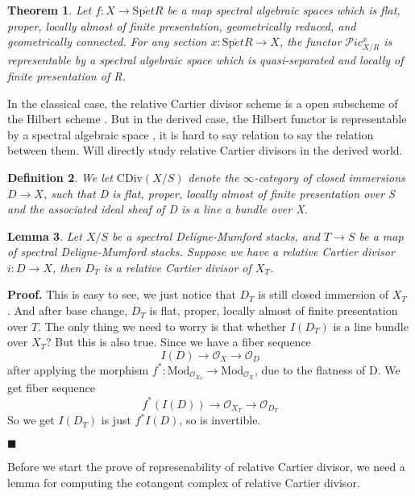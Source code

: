 \documentclass[12pt]{article}
\newtheorem{theorem}{Theorem}[section] %
\newtheorem{lemma}[theorem]{Lemma}
\theoremstyle{thry}
\newtheorem{definition}[theorem]{Definition}
\renewenvironment{proof}
{\par \noindent \textbf{Proof.}}
{ \par \hfill $\blacksquare$ \quad \par }
\def  \CDiv     {\mathrm{CDiv}}
\def  \Mod      {\mathrm{Mod}}
\def  \Spet     {\mathrm{Sp}\acute{e}t}
\def  \co       {\mathcal{O}}
\def  \sp       {\mathscr{P}}
\begin{document}
\begin{theorem}\cite[Theorem 19.2.0.5]{lu-SAG}
	Let $f: X \to \Spet R$ be a map spectral algebraic spaces which is flat, proper, locally almost of finite presentation, geometrically reduced, and geometrically connected. For any section $x: \Spet R \to X$, the functor $\sp ic^x_{X/R}$ is representable by a spectral algebraic space which is quasi-separated and locally of finite presentation of R.
\end{theorem}

 In the classical case, the relative Cartier divisor scheme is a open subscheme of the Hilbert scheme \cite{kollar2013rational}. But in the derived case, the Hilbert functor is representable by a spectral algebraic space \cite[Theorem 8.3.3]{lurie2004derived}, it is hard to say relation to say the relation between them. Will directly study  relative Cartier divisors in the derived world.







\begin{definition}
	We let $\CDiv(X/S)$ denote the $\infty$-category of closed immersions $D \to X$, such that D is flat, proper, locally almost of finite presentation over S and  the associated ideal sheaf of D is a line a bundle over X.
\end{definition}


\begin{lemma}\label{cartdiv base change}
	Let $X/S$ be a spectral Deligne-Mumford stacks, and $T \to S$ be a map of spectral Deligne-Mumford stacks.
	 Suppose we have a relative Cartier divisor $i:D \to X$, then $D_T$ is a relative Cartier divisor of $X_T$.
\end{lemma}
\begin{proof}
	This is easy to see, we just notice that $D_T$ is still closed immersion of  $X_T$ \cite[Corollary 3.1.2.3]{lu-SAG}. And after base change, $D_T$ is flat, proper, locally almost of finite presentation over $T$. The only thing we need to worry is that  whether $I(D_T)$ is  a line bundle over $X_T$? But this is also true. Since we have a fiber sequence
	$$
  	I(D)  \to \co_X  \to  \co_D 
	$$
	after applying the morphism $f^*:  \Mod_{ \co_{X_T}} \to  \Mod_{ \co_{X}}$, due to the flatness of D. We get fiber sequence
	$$
   f^*(I(D)) \to  \co_{X_T} \to   \co_{D_T}
	$$
	So we get $I(D_T)$  is just $f^*{I(D)}$, so is invertible.
\end{proof}

Before we start the prove of represenability of relative Cartier divisor,  we need a lemma for computing the cotangent complex of relative Cartier divisor.
\end{document}
